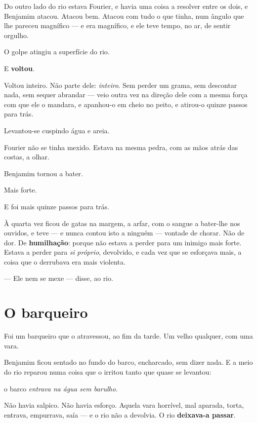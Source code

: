 \documentclass[livro.tex]{subfiles}
\begin{document}
Do outro lado do rio estava Fourier, e havia uma coisa a resolver entre os dois, e Benjamim atacou. Atacou bem.
Atacou com tudo o que tinha, num ângulo que lhe pareceu magnífico --- e era magnífico, e ele teve tempo, no ar, de
sentir orgulho.

O golpe atingiu a superfície do rio.

E \textbf{voltou}.

\medskip

Voltou inteiro. Não parte dele: \emph{inteiro}. Sem perder um grama, sem descontar nada, sem sequer abrandar --- veio
outra vez na direção dele com a mesma força com que ele o mandara, e apanhou-o em cheio no peito, e atirou-o quinze
passos para trás.

Levantou-se cuspindo água e areia.

Fourier não se tinha mexido. Estava na mesma pedra, com as mãos atrás das costas, a olhar.

\medskip

Benjamim tornou a bater.

Mais forte.

\medskip

E foi mais quinze passos para trás.

\medskip

À quarta vez ficou de gatas na margem, a arfar, com o sangue a bater-lhe nos ouvidos, e teve --- e nunca contou isto
a ninguém --- vontade de chorar. Não de dor. De \textbf{humilhação}: porque não estava a perder para um inimigo mais
forte. Estava a perder para \emph{si próprio}, devolvido, e cada vez que se esforçava mais, a coisa que o derrubava
era mais violenta.

--- Ele nem se mexe --- disse, ao rio.

\section*{O barqueiro}

Foi um barqueiro que o atravessou, ao fim da tarde. Um velho qualquer, com uma vara.

Benjamim ficou sentado no fundo do barco, encharcado, sem dizer nada. E a meio do rio reparou numa coisa que o
irritou tanto que quase se levantou:

o barco \emph{entrava na água sem barulho}.

Não havia salpico. Não havia esforço. Aquela vara horrível, mal aparada, torta, entrava, empurrava, saía --- e o rio
não a devolvia. O rio \textbf{deixava-a passar}.
\end{document}
